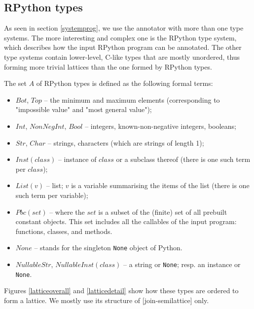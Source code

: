 \documentclass{acm_proc_article-sp}
\begin{document}
\subsection{RPython types}

As seen in section \ref{systemprog}, we use the annotator with more than one type
systems.  The more interesting and complex one is the RPython type
system, which describes how the input RPython program can be annotated.
The other type systems contain lower-level, C-like types that are mostly
unordered, thus forming more trivial lattices than the one formed by
RPython types.

The set $A$ of RPython types is defined as the following formal terms:
%
\begin{itemize}
\item $Bot$, $Top$ -- the minimum and maximum elements (corresponding
      to "impossible value" and "most general value");

\item $Int$, $NonNegInt$, $Bool$ -- integers, known-non-negative
      integers, booleans;

\item $Str$, $Char$ -- strings, characters (which are strings of
      length 1);

\item $Inst(class)$ -- instance of $class$ or a subclass thereof
      (there is one such term per $class$);

\item $List(v)$ -- list; $v$ is a variable summarising the items of
      the list (there is one such term per variable);

\item $Pbc(set)$ -- where the $set$ is a subset of the (finite) set of
      all prebuilt constant objects.  This set includes all the
      callables of the input program: functions, classes, and methods.

\item $None$ -- stands for the singleton \texttt{None} object of
      Python.

\item $NullableStr$, $NullableInst(class)$ -- a string or
      \texttt{None}; resp. an instance or \texttt{None}.
\end{itemize}
%
Figures \ref{latticeoverall} and \ref{latticedetail} show how these
types are ordered to form a lattice.  We mostly use its structure of
[join-semilattice] only.
\end{document}
